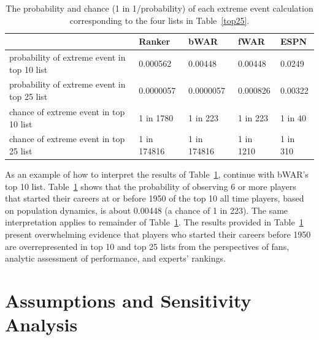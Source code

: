 \documentclass[11pt]{article}\usepackage[]{graphicx}\usepackage[]{color}
\begin{document}
\begin{table}[h!]
\begin{center}
\begin{tabular}{lllll}
\hline
  &  Ranker  &  bWAR  &  fWAR  &  ESPN \\
  \hline
probability of extreme event in top 10 list 
  & 0.000562 
  & 0.00448 
  & 0.00448 
  & 0.0249 \\
probability of extreme event in top 25 list 
  & 0.0000057 
  & 0.0000057 
  & 0.000826 
  & 0.00322 \\
chance of extreme event in top 10 list 
  & 1 in 1780 
  & 1 in 223 
  & 1 in 223 
  & 1 in 40 \\
chance of extreme event in top 25 list 
  & 1 in 174816 
  & 1 in 174816 
  & 1 in 1210 
  & 1 in 310 \\
  \hline
\end{tabular}
\end{center}
\caption{The probability and chance (1 in 1/probability) of each extreme event 
  calculation corresponding to the four lists in Table~\ref{top25}.}
\label{probvalues}
\end{table}

As an example of how to interpret the results of Table~\ref{probvalues}, 
continue with bWAR's top 10 list.  Table~\ref{probvalues} shows that the 
probability of observing 6 or more players that started their careers at 
or before 1950 of the top 10 all time players, based on population 
dynamics, is about 0.00448 
(a chance of 1 in 223).
The same interpretation applies to remainder of Table~\ref{probvalues}.  
The results provided in Table~\ref{probvalues} present overwhelming evidence 
that players who started their careers before 1950 are overrepresented in top 
10 and top 25 lists from the perspectives of fans, analytic assessment of 
performance, and experts' rankings.  %




\section{Assumptions and Sensitivity Analysis}
\label{sec:Assumptions}
\end{document}

